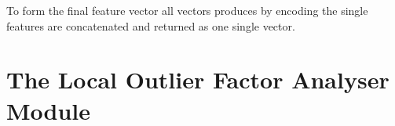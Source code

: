 To form the final feature vector all vectors produces by encoding the single features are concatenated and returned as one single vector.

\section{The Local Outlier Factor Analyser Module}
\label{sec:impl:lof}

\begin{comment}
\begin{itemize}
	\item purpose is to detect uncommon bus activity
	\item world view as well as agent based
	\item uses the \gls{lof} implementation of Scikit-learn \parencite{Pedregosa2011}
	

\end{comment}
